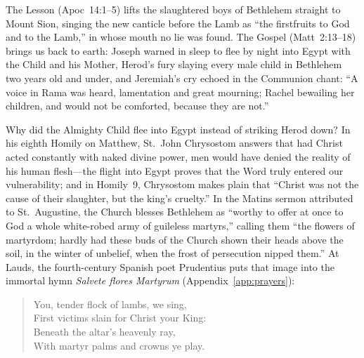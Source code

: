 The Lesson (Apoc~14:1--5) lifts the slaughtered boys of Bethlehem straight to
Mount Sion, singing the new canticle before the Lamb as ``the firstfruits to God
and to the Lamb,'' in whose mouth no lie was found. The Gospel (Matt~2:13--18)
brings us back to earth: Joseph warned in sleep to flee by night into Egypt with
the Child and his Mother, Herod's fury slaying every male child in Bethlehem
two years old and under, and Jeremiah's cry echoed in the Communion chant: ``A
voice in Rama was heard, lamentation and great mourning; Rachel bewailing her
children, and would not be comforted, because they are not.''

Why did the Almighty Child flee into Egypt instead of striking Herod down? In
his eighth Homily on Matthew, St.~John Chrysostom answers that had Christ
acted constantly with naked divine power, men would have denied the reality of
his human flesh---the flight into Egypt proves that the Word truly entered our
vulnerability; and in Homily~9, Chrysostom makes plain that ``Christ was not
the cause of their slaughter, but the king's cruelty.'' In the Matins sermon
attributed to St.~Augustine, the Church blesses Bethlehem as ``worthy to offer
at once to God a whole white-robed army of guileless martyrs,'' calling them
``the flowers of martyrdom; hardly had these buds of the Church shown their
heads above the soil, in the winter of unbelief, when the frost of persecution
nipped them.'' At Lauds, the fourth-century Spanish poet Prudentius puts that
image into the immortal hymn \textit{Salvete flores Martyrum}
(Appendix~\ref{app:prayers}):

\begin{quote}
You, tender flock of lambs, we sing,\\
First victims slain for Christ your King:\\
Beneath the altar's heavenly ray,\\
With martyr palms and crowns ye play.
\end{quote}
